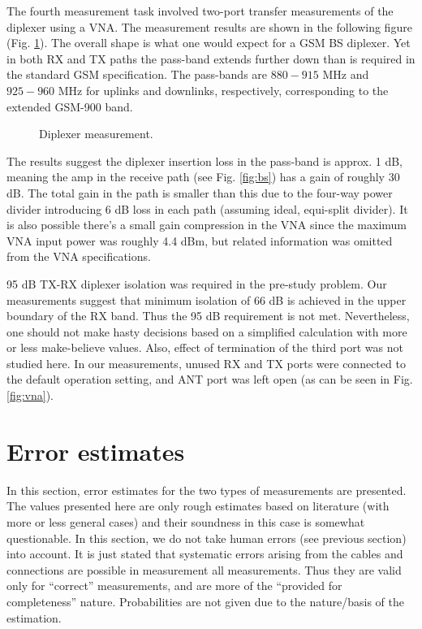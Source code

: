 \documentclass[a4paper, 12pt]{article}
\begin{document}
The fourth measurement task involved two-port transfer measurements of the diplexer 
using a VNA. The measurement results are shown in the following figure (Fig. \ref{fig:dpx}). 
The overall shape is what one would expect for a GSM BS diplexer. Yet in both RX and TX 
paths the pass-band extends further down than is required in the standard GSM specification. 
The pass-bands are $880 - 915$ MHz and $925 - 960$ MHz for uplinks and downlinks, respectively, 
corresponding to the extended GSM-900 band.

\begin{figure}[h!]
	\begin{center}
	\caption{Diplexer measurement.}
	\label{fig:dpx}
	\end{center}
	\vspace*{-12pt}
\end{figure}

The results suggest the diplexer insertion loss in the pass-band is approx. 1 dB, meaning the 
amp in the receive path (see Fig. \ref{fig:bs}) has a gain of roughly 30 dB. The total gain 
in the path is smaller than this due to the four-way power divider introducing 6 dB loss in 
each path (assuming ideal, equi-split divider). It is also possible there's a small gain 
compression in the VNA since the maximum VNA input power was roughly 4.4 dBm, but related 
information was omitted from the VNA specifications.

95 dB TX-RX diplexer isolation was required in the pre-study problem. Our measurements suggest 
that minimum isolation of 66 dB is achieved in the upper boundary of the RX band. Thus the 
95 dB requirement is not met. Nevertheless, one should not make hasty decisions based on a 
simplified calculation with more or less make-believe values. Also, effect of termination of 
the third port was not studied here. In our measurements, unused RX and TX ports were connected 
to the default operation setting, and ANT port was left open (as can be seen in Fig. \ref{fig:vna}).


\newpage
\section{Error estimates}

In this section, error estimates for the two types of measurements are presented.
The values presented here are only rough estimates based on literature (with more 
or less general cases) and their soundness in this case is somewhat questionable. 
In this section, we do not take human errors (see previous section) into account. 
It is just stated that systematic errors arising from the cables and connections 
are possible in measurement all measurements. Thus they are valid only for 
``correct'' measurements, and are more of the ``provided for completeness'' 
nature. Probabilities are not given due to the nature/basis of the estimation.
\end{document}
